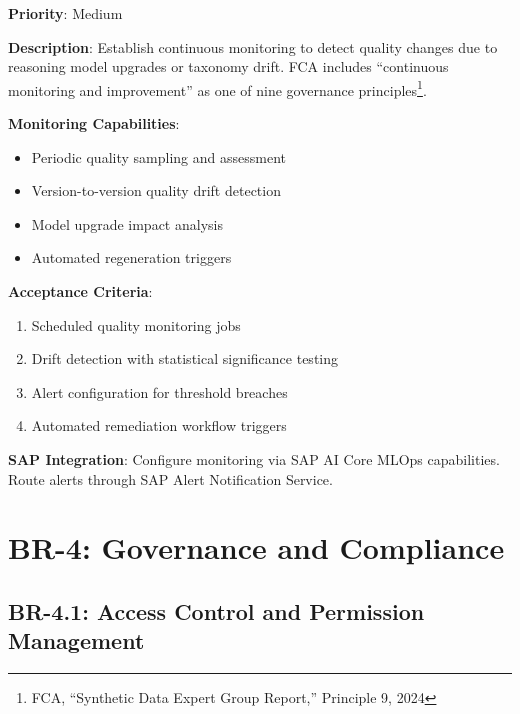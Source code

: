 \begin{tcolorbox}[colback=yellow!5,colframe=yellow!70,title=BR-3.5: Quality Drift Monitoring]
\textbf{Priority}: Medium

\textbf{Description}: Establish continuous monitoring to detect quality changes
due to reasoning model upgrades or taxonomy drift. FCA includes ``continuous
monitoring and improvement'' as one of nine governance principles\footnote{FCA,
``Synthetic Data Expert Group Report,'' Principle 9, 2024}.

\textbf{Monitoring Capabilities}:
\begin{itemize}
  \item Periodic quality sampling and assessment
  \item Version-to-version quality drift detection
  \item Model upgrade impact analysis
  \item Automated regeneration triggers
\end{itemize}

\textbf{Acceptance Criteria}:
\begin{enumerate}
  \item Scheduled quality monitoring jobs
  \item Drift detection with statistical significance testing
  \item Alert configuration for threshold breaches
  \item Automated remediation workflow triggers
\end{enumerate}

\textbf{SAP Integration}: Configure monitoring via SAP AI Core MLOps capabilities.
Route alerts through SAP Alert Notification Service.
\end{tcolorbox}


\section{BR-4: Governance and Compliance}

\subsection{BR-4.1: Access Control and Permission Management}

